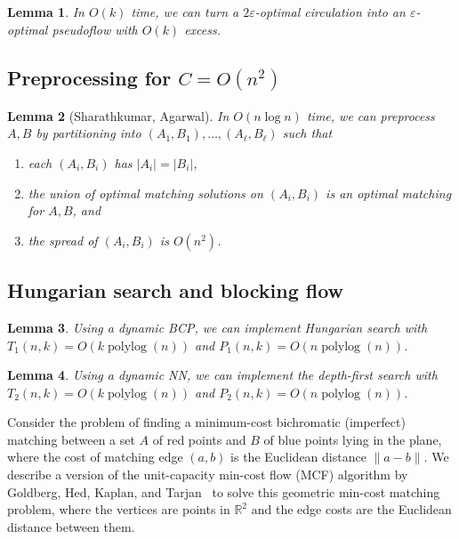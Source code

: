 \documentclass[11pt]{article}
\def\polylog{\mathop{\mathrm{polylog}}}
\def\eps{\varepsilon}
\theoremstyle{plain}
\newtheorem{lemma}{Lemma}
\begin{document}
\begin{lemma}
	In $O(k)$ time, we can turn a $2\eps$-optimal circulation into an
	$\eps$-optimal pseudoflow with $O(k)$ excess.
\end{lemma}


\subsection{Preprocessing for $C = O(n^2)$}

\begin{lemma}[Sharathkumar, Agarwal]
	In $O(n\log n)$ time, we can preprocess $A, B$ by partitioning into
	$(A_1, B_1), \ldots, (A_\ell, B_\ell)$ such that 
	\begin{enumerate}
	\item each $(A_i, B_i)$ has $|A_i| = |B_i|$,
	\item the union of optimal matching solutions on $(A_i, B_i)$
		is an optimal matching for $A, B$, and
	\item the spread of $(A_i, B_i)$ is $O(n^2)$.
	\end{enumerate}
\end{lemma}


\subsection{Hungarian search and blocking flow}

\begin{lemma}
	Using a dynamic BCP, we can implement Hungarian search with 
	$T_1(n, k) = O(k\polylog(n))$ and $P_1(n, k) = O(n\polylog(n))$.
\end{lemma}


\begin{lemma}
	Using a dynamic NN, we can implement the depth-first search with 
	$T_2(n, k) = O(k\polylog(n))$ and $P_2(n, k) = O(n\polylog(n))$.
\end{lemma}





















Consider the problem of finding a minimum-cost bichromatic (imperfect) matching between a set 
$A$ of red points and $B$ of blue points lying in the plane,
where the cost of matching edge $(a, b)$ is the Euclidean distance $\|a - b\|$.
We describe a version of the unit-capacity min-cost flow (MCF) 
algorithm by Goldberg, Hed, Kaplan, and Tarjan~\cite{DBLP:journals/mst/GoldbergHKT17} 
to solve this geometric min-cost matching problem,
where the vertices are points in $\mathbb{R}^2$ and 
the edge costs are the Euclidean distance between them.
\end{document}
